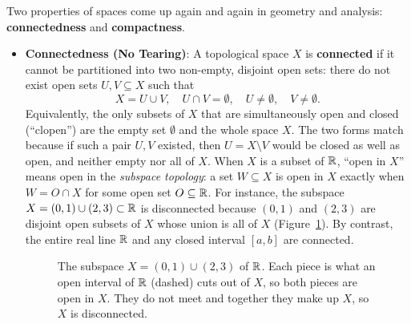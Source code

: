 Two properties of spaces come up again and again in geometry and analysis: \textbf{connectedness} and \textbf{compactness}.

\begin{itemize}
  \item \textbf{Connectedness (No Tearing)}: A topological space $X$ is \textbf{connected} if it cannot be partitioned into two non-empty, disjoint open sets: there do not exist open sets $U, V \subseteq X$ such that
  \[
  X = U \cup V, \quad U \cap V = \emptyset, \quad U \neq \emptyset, \quad V \neq \emptyset.
  \]
  Equivalently, the only subsets of $X$ that are simultaneously open and closed (``clopen'') are the empty set $\emptyset$ and the whole space $X$. The two forms match because if such a pair $U, V$ existed, then $U = X \setminus V$ would be closed as well as open, and neither empty nor all of $X$. When $X$ is a subset of $\mathbb{R}$, ``open in $X$'' means open in the \emph{subspace topology}: a set $W \subseteq X$ is open in $X$ exactly when $W = O \cap X$ for some open set $O \subseteq \mathbb{R}$. For instance, the subspace $X = (0, 1) \cup (2, 3) \subset \mathbb{R}$ is disconnected because $(0, 1)$ and $(2, 3)$ are disjoint open subsets of $X$ whose union is all of $X$ (Figure~\ref{37:fig-subspace}). By contrast, the entire real line $\mathbb{R}$ and any closed interval $[a, b]$ are connected.

\begin{figure}[htbp]
\centering
{}
\caption{The subspace $X = (0, 1) \cup (2, 3)$ of $\mathbb{R}$. Each piece is what an open interval of $\mathbb{R}$ (dashed) cuts out of $X$, so both pieces are open in $X$. They do not meet and together they make up $X$, so $X$ is disconnected.}\label{37:fig-subspace}
\end{figure}
  

\end{itemize}
